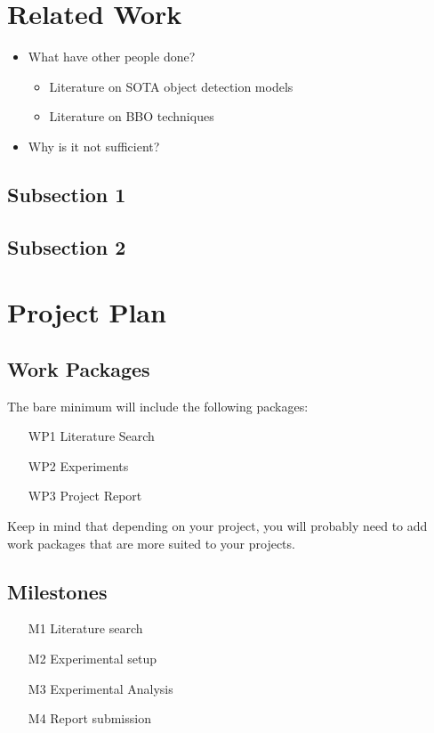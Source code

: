 \documentclass[thesis]{mas_proposal}
\begin{document}
\section{Related Work}
\begin{itemize}
    \item What have other people done?
    \begin{itemize}
        \item Literature on SOTA object detection models
        \item Literature on BBO techniques
    \end{itemize}
    \item Why is it not sufficient?
\end{itemize}

\subsection{Subsection 1}
\subsection{Subsection 2}



\section{Project Plan}

\subsection{Work Packages}
The bare minimum will include the following packages:
\begin{enumerate}
    \item[WP1] Literature Search
    \item[WP2] Experiments
    \item[WP3] Project Report
\end{enumerate}
Keep in mind that depending on your project, you will probably need to add work packages that are more suited to your projects.

\subsection{Milestones}
\begin{enumerate}
    \item[M1] Literature search
    \item[M2] Experimental setup
    \item[M3] Experimental Analysis
    \item[M4] Report submission
\end{enumerate}
\end{document}
